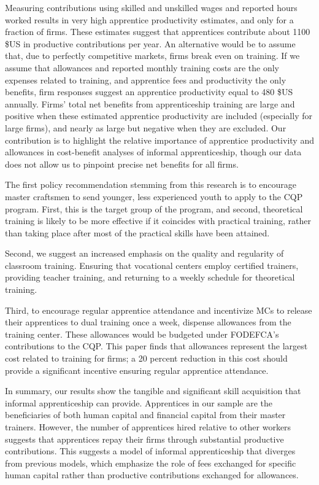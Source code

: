 \documentclass[
  a4paper, twoside, 12pt]{book}
\begin{document}
Measuring contributions using skilled and unskilled wages and reported hours worked results in very high apprentice productivity estimates, and only for a fraction of firms. These estimates suggest that apprentices contribute about 1100 \$US in productive contributions per year. An alternative would be to assume that, due to perfectly competitive markets, firms break even on training. If we assume that allowances and reported monthly training costs are the only expenses related to training, and apprentice fees and productivity the only benefits, firm responses suggest an apprentice productivity equal to 480 \$US annually. Firms' total net benefits from apprenticeship training are large and positive when these estimated apprentice productivity are included (especially for large firms), and nearly as large but negative when they are excluded. Our contribution is to highlight the relative importance of apprentice productivity and allowances in cost-benefit analyses of informal apprenticeship, though our data does not allow us to pinpoint precise net benefits for all firms.

The first policy recommendation stemming from this research is to encourage master craftsmen to send younger, less experienced youth to apply to the CQP program. First, this is the target group of the program, and second, theoretical training is likely to be more effective if it coincides with practical training, rather than taking place after most of the practical skills have been attained.

Second, we suggest an increased emphasis on the quality and regularity of classroom training. Ensuring that vocational centers employ certified trainers, providing teacher training, and returning to a weekly schedule for theoretical training.

Third, to encourage regular apprentice attendance and incentivize MCs to release their apprentices to dual training once a week, dispense allowances from the training center. These allowances would be budgeted under FODEFCA's contributions to the CQP. This paper finds that allowances represent the largest cost related to training for firms; a 20 percent reduction in this cost should provide a significant incentive ensuring regular apprentice attendance.

In summary, our results show the tangible and significant skill acquisition that informal apprenticeship can provide. Apprentices in our sample are the beneficiaries of both human capital and financial capital from their master trainers. However, the number of apprentices hired relative to other workers suggests that apprentices repay their firms through substantial productive contributions. This suggests a model of informal apprenticeship that diverges from previous models, which emphasize the role of fees exchanged for specific human capital rather than productive contributions exchanged for allowances.
\end{document}
